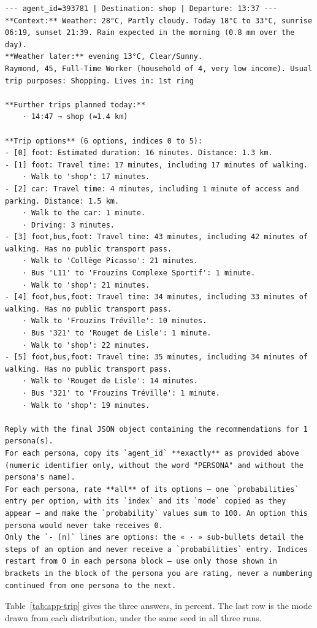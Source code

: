 \begin{Verbatim}
--- agent_id=393781 | Destination: shop | Departure: 13:37 ---
**Context:** Weather: 28°C, Partly cloudy. Today 18°C to 33°C, sunrise 06:19, sunset 21:39. Rain expected in the morning (0.8 mm over the day).
**Weather later:** evening 13°C, Clear/Sunny.
Raymond, 45, Full-Time Worker (household of 4, very low income). Usual trip purposes: Shopping. Lives in: 1st ring

**Further trips planned today:**
    · 14:47 → shop (≈1.4 km)

**Trip options** (6 options, indices 0 to 5):
- [0] foot: Estimated duration: 16 minutes. Distance: 1.3 km.
- [1] foot: Travel time: 17 minutes, including 17 minutes of walking.
    · Walk to 'shop': 17 minutes.
- [2] car: Travel time: 4 minutes, including 1 minute of access and parking. Distance: 1.5 km.
    · Walk to the car: 1 minute.
    · Driving: 3 minutes.
- [3] foot,bus,foot: Travel time: 43 minutes, including 42 minutes of walking. Has no public transport pass.
    · Walk to 'Collège Picasso': 21 minutes.
    · Bus 'L11' to 'Frouzins Complexe Sportif': 1 minute.
    · Walk to 'shop': 21 minutes.
- [4] foot,bus,foot: Travel time: 34 minutes, including 33 minutes of walking. Has no public transport pass.
    · Walk to 'Frouzins Tréville': 10 minutes.
    · Bus '321' to 'Rouget de Lisle': 1 minute.
    · Walk to 'shop': 22 minutes.
- [5] foot,bus,foot: Travel time: 35 minutes, including 34 minutes of walking. Has no public transport pass.
    · Walk to 'Rouget de Lisle': 14 minutes.
    · Bus '321' to 'Frouzins Tréville': 1 minute.
    · Walk to 'shop': 19 minutes.

Reply with the final JSON object containing the recommendations for 1 persona(s).
For each persona, copy its `agent_id` **exactly** as provided above (numeric identifier only, without the word "PERSONA" and without the persona's name).
For each persona, rate **all** of its options — one `probabilities` entry per option, with its `index` and its `mode` copied as they appear — and make the `probability` values sum to 100. An option this persona would never take receives 0.
Only the `- [n]` lines are options: the « · » sub-bullets detail the steps of an option and never receive a `probabilities` entry. Indices restart from 0 in each persona block — use only those shown in brackets in the block of the persona you are rating, never a numbering continued from one persona to the next.
\end{Verbatim}

Table~\ref{tab:app-trip} gives the three answers, in percent. The last row is the mode drawn
from each distribution, under the same seed in all three runs.

